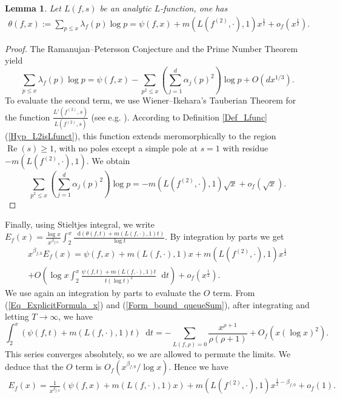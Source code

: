 \documentclass[a4paper,10pt]{amsart}
\theoremstyle{plain}
\newtheorem{lem}[theo]{Lemma}
\theoremstyle{definition}
\begin{document}
\begin{lem}\label{Lm_f2}
Let $L(f,s)$ be an analytic $L$-function, 
one has
\begin{align}
\theta(f,x) := \sum_{p\leq x}\lambda_{f}(p)\log p  = \psi(f,x) +m(L(f^{(2)},\cdot),1)x^{\frac{1}{2}} + o_{f}(x^{\frac{1}{2}}).
\end{align}
\end{lem}

\begin{proof}
The Ramanujan--Petersson Conjecture and the Prime Number Theorem yield
$$\sum_{p\leq x}\lambda_{f}(p)\log p = \psi(f,x) 
- \sum_{p^{2}\leq x}\left(\sum_{j=1}^{d} \alpha_{j}(p)^2\right) \log p
+ O(dx^{1/3}).$$
To evaluate the second term, we use Wiener--Ikehara's Tauberian Theorem for the function
$\frac{L'(f^{(2)},s)}{L(f^{(2)},s)}$ (see e.g. \cite[II.7.5]{Tenenbaum}). 
According to Definition \ref{Def_Lfunc}(\ref{Hyp_L2isLfunct}), this function extends meromorphically to the region $\operatorname{Re}(s) \geq 1$, with no poles except a simple pole at $s = 1$ with residue $-m(L(f^{(2)},\cdot),1)$.
We obtain
$$\sum_{p^{2}\leq x}\left(\sum_{j=1}^{d} \alpha_{j}(p)^2\right) \log p 
= -m(L(f^{(2)},\cdot),1)\sqrt{x} + o_{f}(\sqrt{x}).$$
\end{proof}

Finally, using Stieltjes integral, we write $E_{f}(x) = \frac{\log x}{x^{\beta_{f,0}}} \int_{2}^{x} \frac{{\mathop{}\!\mathrm{d}} (\theta(f,t) + m(L(f,\cdot),1)t)}{\log t}$.
By integration by parts we get
\begin{multline*}
 x^{\beta_{f,0}} E_{f}(x) =  \psi(f,x) + m(L(f,\cdot),1)x + m(L(f^{(2)},\cdot),1)x^{\frac{1}{2}} \\ +
 O\left(\log x  \int_{2}^{x} \frac{\psi(f,t) + m(L(f,\cdot),1)t}{t(\log t)^{2}}{\mathop{}\!\mathrm{d}} t \right)
 + o_{f}(x^{\frac{1}{2}}). 
\end{multline*}
We use again an integration by parts to evaluate the $O$ term.
From (\ref{Eq_ExplicitFormula_x}) and (\ref{Form_bound_queueSum}), after integrating and letting $T\rightarrow\infty$, we have
$$ \int_{2}^{x} \left(\psi(f,t) + m(L(f,\cdot),1)t\right){\mathop{}\!\mathrm{d}} t =
 - \sum_{L(f,\rho)=0}\frac{x^{\rho+1}}{\rho(\rho +1)}  + O_{f}(x(\log x)^{2}).$$
This series converges absolutely, so we are allowed to permute the limits.
We deduce that the $O$ term is $O_{f}(x^{\beta_{f,0}}/\log x)$.
Hence we have 
\begin{align}\label{Form_E_psi}
E_{f}(x) =  \frac{1}{ x^{\beta_{f,0}} }\left(\psi(f,x) + m(L(f,\cdot),1)x\right) + m(L(f^{(2)},\cdot),1)x^{\frac{1}{2}-\beta_{f,0}} 
 + o_{f}(1).
\end{align}
\end{document}
